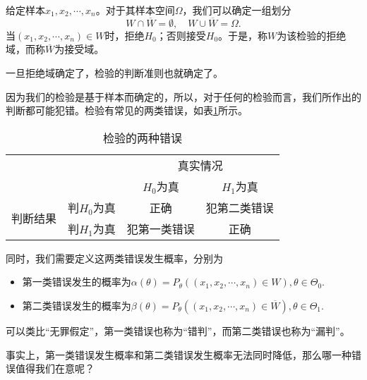 \begin{definition}
    给定样本$x_1,x_2,\cdots,x_n$。对于其样本空间$\Omega$，我们可以确定一组划分
    $$
    W \cap \overline{W} = \emptyset, \quad W \cup \overline{W} = \Omega.
    $$
    当$(x_1,x_2,\cdots,x_n) \in W$时，拒绝$H_0$；否则接受$H_0$。于是，称$W$为该检验的拒绝域，而称$\overline{W}$为接受域。
\end{definition}
\begin{remark} 一旦拒绝域确定了，检验的判断准则也就确定了。
\end{remark}

因为我们的检验是基于样本而确定的，所以，对于任何的检验而言，我们所作出的判断都可能犯错。检验有常见的两类错误，如表\ref{tab:lect22_1}所示。
\begin{table}[ht]
    \centering
    \caption{检验的两种错误} \label{tab:lect22_1}
    \begin{tabular}{c c |cc}
    \hline
    & & \multicolumn{2}{c}{真实情况}\\
    && $H_0$为真 & $H_1$为真\\
    \hline
      \multirow{2}{*}{判断结果}& 判$H_0$为真   &  正确 &  犯第二类错误\\
      & 判$H_1$为真   &  犯第一类错误 &  正确\\
    \hline
    \end{tabular}
  \end{table}
  同时，我们需要定义这两类错误发生概率，分别为
  \begin{itemize}
      \item 第一类错误发生的概率为$\alpha(\theta) = P_{\theta}((x_1,x_2,\cdots,x_n)\in W),\theta \in \Theta_0$.
      \item 第二类错误发生的概率为$\beta(\theta) = P_{\theta}((x_1,x_2,\cdots,x_n)\in \overline{W}),\theta \in \Theta_1$.
  \end{itemize}
\begin{remark}
    可以类比“无罪假定”，第一类错误也称为“错判”，而第二类错误也称为“漏判”。
\end{remark}
\begin{problem}
    事实上，第一类错误发生概率和第二类错误发生概率无法同时降低，那么哪一种错误值得我们在意呢？
\end{problem}

